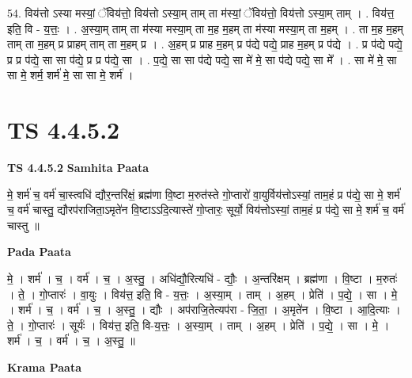 \documentclass[17pt]{extarticle}
\begin{document}
54. विय॑त्तो ऽस्या मस्यां॒ ॅविय॑त्तो॒ विय॑त्तो ऽस्या॒म् ताम् ता म॑स्यां॒ ॅविय॑त्तो॒ विय॑त्तो ऽस्या॒म् ताम् । . विय॑त्त॒ इति॒ वि - य॒त्तः॒ । . अ॒स्या॒म् ताम् ता म॑स्या मस्या॒म् ता म॒ह म॒हम् ता म॑स्या मस्या॒म् ता म॒हम् । . ता म॒ह म॒हम् ताम् ता म॒हम् प्र प्राहम् ताम् ता म॒हम् प्र । . अ॒हम् प्र प्राह म॒हम् प्र प॑द्ये पद्ये॒ प्राह म॒हम् प्र प॑द्ये । . प्र प॑द्ये पद्ये॒ प्र प्र प॑द्ये॒ सा सा प॑द्ये॒ प्र प्र प॑द्ये॒ सा । . प॒द्ये॒ सा सा प॑द्ये पद्ये॒ सा मे॑ मे॒ सा प॑द्ये पद्ये॒ सा मे᳚ । . सा मे॑ मे॒ सा सा मे॒ शर्म॒ शर्म॑ मे॒ सा सा मे॒ शर्म॑ । \newline
\pagebreak
{}

\section{ TS 4.4.5.2 }

\textbf{TS 4.4.5.2 } \newline
\textbf{Samhita Paata} \newline

मे॒ शर्म॑ च॒ वर्म॑ चा॒स्त्वधि॑ द्यौर॒न्तरि॑क्षं॒ ब्रह्म॑णा वि॒ष्टा म॒रुत॑स्ते गो॒प्तारो॑ वा॒युर्विय॑त्तोऽस्यां॒ ताम॒हं प्र प॑द्ये॒ सा मे॒ शर्म॑ च॒ वर्म॑ चास्तु॒ द्यौरप॑राजिता॒ऽमृते॑न वि॒ष्टाऽऽदि॒त्यास्ते॑ गो॒प्तारः॒ सूर्यो॒ विय॑त्तोऽस्यां॒ ताम॒हं प्र प॑द्ये॒ सा मे॒ शर्म॑ च॒ वर्म॑ चास्तु ॥ \newline

\textbf{Pada Paata} \newline

मे॒ । शर्म॑ । च॒ । वर्म॑ । च॒ । अ॒स्तु॒ । अधि॑द्यौ॒रित्यधि॑ - द्यौः॒ । अ॒न्तरि॑क्षम् । ब्रह्म॑णा । वि॒ष्टा । म॒रुतः॑ । ते॒ । गो॒प्तारः॑ । वा॒युः । विय॑त्त॒ इति॒ वि - य॒त्तः॒ । अ॒स्या॒म् । ताम् । अ॒हम् । प्रेति॑ । प॒द्ये॒ । सा । मे॒ । शर्म॑ । च॒ । वर्म॑ । च॒ । अ॒स्तु॒ । द्यौः । अप॑राजि॒तेत्यप॑रा - जि॒ता॒ । अ॒मृते॑न । वि॒ष्टा । आ॒दि॒त्याः । ते॒ । गो॒प्तारः॑ । सूर्यः॑ । विय॑त्त॒ इति॒ वि-य॒त्तः॒ । अ॒स्या॒म् । ताम् । अ॒हम् । प्रेति॑ । प॒द्ये॒ । सा । मे॒ । शर्म॑ । च॒ । वर्म॑ । च॒ । अ॒स्तु॒ ॥  \newline


\textbf{Krama Paata} \newline
\end{document}
